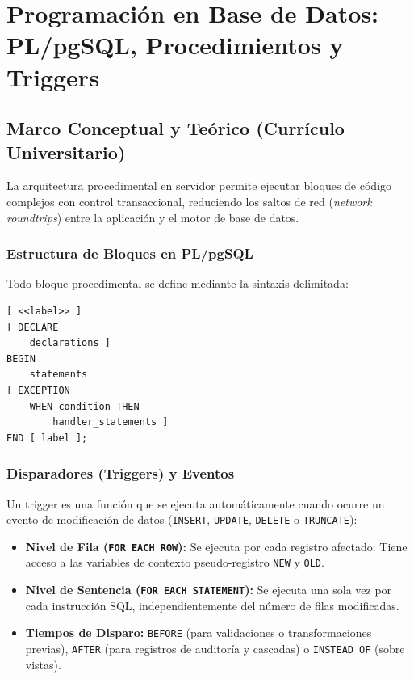 \chapter{Programaci\'on en Base de Datos: PL/pgSQL, Procedimientos y Triggers}
\label{cap:programacion_plpgsql_triggers}

\section{Marco Conceptual y Te\'orico (Curr\'iculo Universitario)}

La arquitectura procedimental en servidor permite ejecutar bloques de c\'odigo complejos con control transaccional, reduciendo los saltos de red (\textit{network roundtrips}) entre la aplicaci\'on y el motor de base de datos.

\subsection{Estructura de Bloques en PL/pgSQL}
Todo bloque procedimental se define mediante la sintaxis delimitada:
\begin{lstlisting}[style=sqlstyle]
[ <<label>> ]
[ DECLARE
    declarations ]
BEGIN
    statements
[ EXCEPTION
    WHEN condition THEN
        handler_statements ]
END [ label ];
\end{lstlisting}

\subsection{Disparadores (Triggers) y Eventos}
Un trigger es una funci\'on que se ejecuta autom\'aticamente cuando ocurre un evento de modificaci\'on de datos (\texttt{INSERT}, \texttt{UPDATE}, \texttt{DELETE} o \texttt{TRUNCATE}):
\begin{itemize}
    \item \textbf{Nivel de Fila (\texttt{FOR EACH ROW}):} Se ejecuta por cada registro afectado. Tiene acceso a las variables de contexto pseudo-registro \texttt{NEW} y \texttt{OLD}.
    \item \textbf{Nivel de Sentencia (\texttt{FOR EACH STATEMENT}):} Se ejecuta una sola vez por cada instrucci\'on SQL, independientemente del n\'umero de filas modificadas.
    \item \textbf{Tiempos de Disparo:} \texttt{BEFORE} (para validaciones o transformaciones previas), \texttt{AFTER} (para registros de auditor\'ia y cascadas) o \texttt{INSTEAD OF} (sobre vistas).
\end{itemize}

